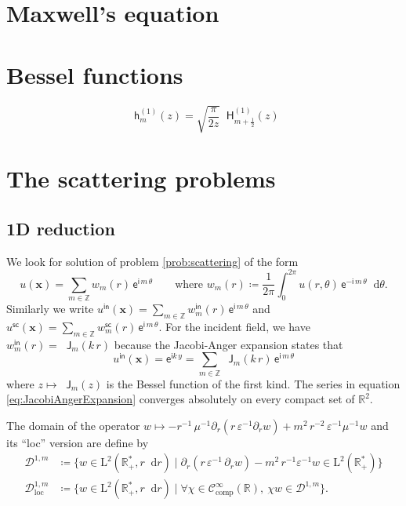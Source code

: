 \documentclass[12pt,a4paper]{article}
\newcommand{\bbR}{\mathbb{R}}
\newcommand{\bbZ}{\mathbb{Z}}
\newcommand{\calD}{\mathcal{D}}
\newcommand{\scrC}{\mathscr{C}}
\newcommand{\rmL}{\mathrm{L}}
\newcommand{\ex}{\mathsf{e}}
\newcommand{\im}{\mathsf{i}}
\newcommand{\bJ}{\mathop{}\!\mathsf{J}}
\newcommand{\Hu}{\mathop{}\!\mathsf{H}^{(1)}}
\newcommand{\hu}{\mathop{}\!\mathsf{h}^{(1)}}
\newcommand{\di}[1]{\mathop{}\!\mathrm{d}#1}
\newcommand{\vx}{\boldsymbol{x}}
\newcommand{\eps}{\varepsilon}
\newcommand{\comp}{\mathrm{comp}}
\newcommand{\loc}{\mathrm{loc}}
\newcommand{\inc}{\mathsf{in}}
\newcommand{\sca}{\mathsf{sc}}
\begin{document}
\section{Maxwell's equation}

\appendix

\section{Bessel functions}

\[
    \hu_m(z) = \sqrt{\frac{\pi}{2z}} \Hu_{m+\frac{1}{2}}(z)
\]

\section{The scattering problems}



\subsection{1D reduction}

We look for solution of problem \eqref{prob:scattering} of the form
\[
    u(\vx) = \sum_{m \in \bbZ} w_m(r)\, \ex^{\im\, m\, \theta} \qquad
    \text{where } w_m(r) \coloneqq \frac{1}{2\pi} \int_0^{2\pi} u(r,\theta)\, \ex^{-\im\, m\, \theta} \di{\theta}.
\]
Similarly we write $u^\inc(\vx) = \sum_{m \in \bbZ} w_m^\inc(r)\, \ex^{\im\, m\, \theta}$ and $u^\sca(\vx) = \sum_{m \in \bbZ} w_m^\sca(r)\, \ex^{\im\, m\, \theta}$.
For the incident field, we have $w_m^\inc(r) = \bJ_m(k\, r)$ because the Jacobi-Anger expansion \cite[Eq.~10.12.1]{NIST:DLMF} states that
\begin{equation}\label{eq:JacobiAngerExpansion}
    u^\inc(\vx) = \ex^{\im k\, y} = \sum_{m \in \bbZ} \bJ_m(k\, r)\, \ex^{\im\, m\, \theta}
\end{equation}
where $z \mapsto \bJ_m(z)$ is the Bessel function of the first kind.
The series in equation \eqref{eq:JacobiAngerExpansion} converges absolutely on every compact set of $\bbR^2$.

The domain of the operator $w \mapsto -r^{-1}\, \mu^{-1} \partial_r(r\, \eps^{-1} \partial_r w) + m^2\, r^{-2}\, \eps^{-1}\mu^{-1} w$ and its ``loc'' version are define by
\begin{align*}
    \calD^{1, m} &\coloneqq \{w \in \rmL^2(\bbR_+^*, r\di{r}) \mid \partial_r(r\, \eps^{-1}\, \partial_r w) - m^2\, r^{-1}\eps^{-1} w \in \rmL^2(\bbR_+^*)\}\\
    \calD^{1, m}_\loc &\coloneqq \{w \in \rmL^2(\bbR_+^*, r\di{r}) \mid \forall \chi \in \scrC_\comp^\infty(\bbR),\ \chi w \in \calD^{1, m}\}.
\end{align*}
\end{document}
